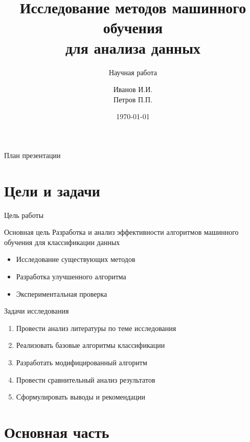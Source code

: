 \documentclass[12pt]{beamer}
\title{Исследование методов машинного обучения\\для анализа данных}
\subtitle{Научная работа}
\author{Иванов И.И.\\Петров П.П.}
\institute{Кафедра информатики\\Университет}
\date{\today}
\begin{document}
\begin{frame}
    \titlepage
\end{frame}

\begin{frame}{План презентации}
    \tableofcontents
\end{frame}

\section{Цели и задачи}

\begin{frame}{Цель работы}
    \begin{block}{Основная цель}
        Разработка и анализ эффективности алгоритмов машинного обучения для классификации данных
    \end{block}
    
    \vspace{0.5cm}
    
    \begin{itemize}
        \item Исследование существующих методов
        \item Разработка улучшенного алгоритма
        \item Экспериментальная проверка
    \end{itemize}
\end{frame}

\begin{frame}{Задачи исследования}
    \begin{enumerate}
        \item Провести анализ литературы по теме исследования
        \item Реализовать базовые алгоритмы классификации
        \item Разработать модифицированный алгоритм
        \item Провести сравнительный анализ результатов
        \item Сформулировать выводы и рекомендации
    \end{enumerate}
\end{frame}

\section{Основная часть}
\end{document}
